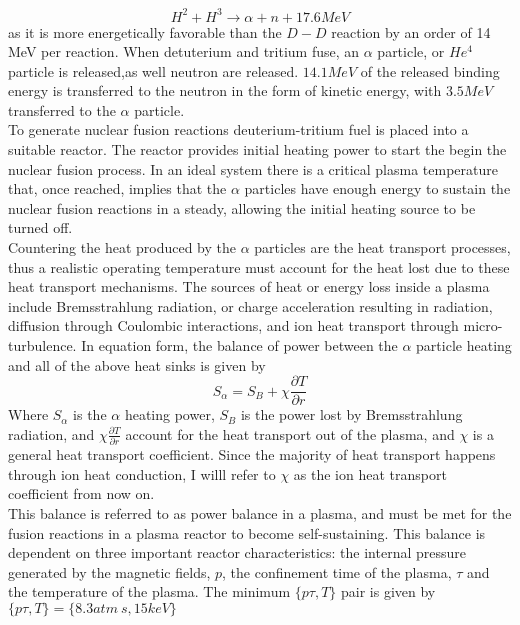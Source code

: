 \documentclass{article}
\begin{document}
$$
H^2 + H^3 \rightarrow \alpha + n + 17.6 MeV
$$
as it is more energetically favorable than the $D-D$ reaction by an order of 14 MeV per reaction. When detuterium and tritium fuse, an $\alpha$ particle, or $He^4$ particle is released,as well neutron are released. %
$14.1 MeV$ of the released binding energy is transferred to the neutron in the form of kinetic energy, with $3.5 MeV$ transferred to the $\alpha$ particle. \\
To generate nuclear fusion reactions deuterium-tritium fuel is placed into a suitable reactor. The reactor provides initial heating power  to start the begin the nuclear fusion process. In an ideal system there is a critical plasma temperature that, once reached, implies that the $\alpha$ particles have enough energy to sustain the nuclear fusion reactions in a steady, allowing the initial heating source to be turned off.\\

Countering the heat produced by the $\alpha$ particles are the heat transport processes, thus a realistic operating temperature must account for the heat lost due to these heat transport mechanisms. The sources of heat or energy loss inside a plasma include Bremsstrahlung radiation, or charge acceleration resulting in radiation, diffusion through Coulombic interactions, and ion heat transport through micro-turbulence. In equation form, the balance of power between the $\alpha$ particle heating and all of the above heat sinks is given by
$$
S_{\alpha} = S_B + \chi\frac{\partial T}{\partial r}
$$
Where $S_{\alpha}$ is the $\alpha$ heating power, $S_B$ is the power lost by Bremsstrahlung radiation, and    $\chi\frac{\partial T}{\partial r}$ account for the heat transport out of the plasma, and $\chi$ is a general heat transport coefficient. 
Since the majority of heat transport happens through ion heat conduction, I willl refer to $\chi$ as the ion heat transport coefficient from now on.\\
This balance is referred to as power balance in a plasma, and must be met for the fusion reactions in a plasma reactor to become self-sustaining. This balance is dependent on three important reactor characteristics: the internal pressure generated by the magnetic fields, $p$, the confinement time of the plasma, $\tau$ and the temperature of the plasma. The minimum $\{p\tau,T\}$ pair is given by $\{p\tau,T\} = \{8.3 atm\ s, 15keV\}$\\%
\end{document}
